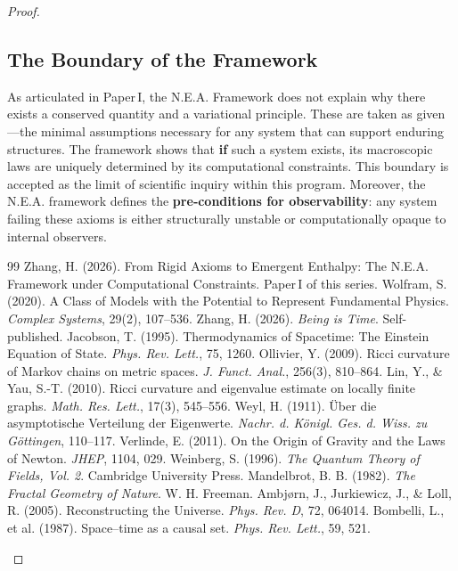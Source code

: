 \documentclass{article}
\begin{document}
\begin{proof}
\subsection{The Boundary of the Framework}
As articulated in Paper I, the N.E.A. Framework does not explain why there exists a conserved quantity and a variational principle. These are taken as given—the minimal assumptions necessary for any system that can support enduring structures. The framework shows that \textbf{if} such a system exists, its macroscopic laws are uniquely determined by its computational constraints. This boundary is accepted as the limit of scientific inquiry within this program. Moreover, the N.E.A. framework defines the \textbf{pre‑conditions for observability}: any system failing these axioms is either structurally unstable or computationally opaque to internal observers.

\begin{thebibliography}{99}
 Zhang, H. (2026). From Rigid Axioms to Emergent Enthalpy: The N.E.A. Framework under Computational Constraints. Paper I of this series.
 Wolfram, S. (2020). A Class of Models with the Potential to Represent Fundamental Physics. \textit{Complex Systems}, 29(2), 107–536.
 Zhang, H. (2026). \textit{Being is Time}. Self-published.
 Jacobson, T. (1995). Thermodynamics of Spacetime: The Einstein Equation of State. \textit{Phys. Rev. Lett.}, 75, 1260.
 Ollivier, Y. (2009). Ricci curvature of Markov chains on metric spaces. \textit{J. Funct. Anal.}, 256(3), 810–864.
 Lin, Y., \& Yau, S.-T. (2010). Ricci curvature and eigenvalue estimate on locally finite graphs. \textit{Math. Res. Lett.}, 17(3), 545–556.
 Weyl, H. (1911). Über die asymptotische Verteilung der Eigenwerte. \textit{Nachr. d. Königl. Ges. d. Wiss. zu Göttingen}, 110–117.
 Verlinde, E. (2011). On the Origin of Gravity and the Laws of Newton. \textit{JHEP}, 1104, 029.
 Weinberg, S. (1996). \textit{The Quantum Theory of Fields, Vol. 2}. Cambridge University Press.
 Mandelbrot, B. B. (1982). \textit{The Fractal Geometry of Nature}. W. H. Freeman.
 Ambjørn, J., Jurkiewicz, J., \& Loll, R. (2005). Reconstructing the Universe. \textit{Phys. Rev. D}, 72, 064014.
 Bombelli, L., et al. (1987). Space–time as a causal set. \textit{Phys. Rev. Lett.}, 59, 521.
\end{thebibliography}


\end{proof}
\end{document}
